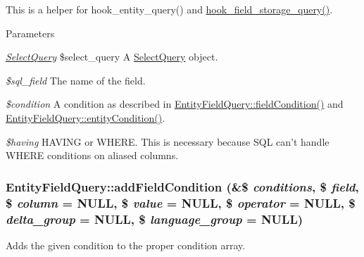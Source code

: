 This is a helper for hook\_\-entity\_\-query() and \hyperlink{group__field__storage_gaf46795ee1b678a72b4457b524303c794}{hook\_\-field\_\-storage\_\-query()}.


\begin{DoxyParams}{Parameters}
\item[{\em \hyperlink{classSelectQuery}{SelectQuery}}]\$select\_\-query A \hyperlink{classSelectQuery}{SelectQuery} object. \item[{\em \$sql\_\-field}]The name of the field. \item[{\em \$condition}]A condition as described in \hyperlink{classEntityFieldQuery_aa8f9660691c0ff6aca2e535c3df78e92}{EntityFieldQuery::fieldCondition()} and \hyperlink{classEntityFieldQuery_a08559bd2f164f707a7ad18eff6622017}{EntityFieldQuery::entityCondition()}. \item[{\em \$having}]HAVING or WHERE. This is necessary because SQL can't handle WHERE conditions on aliased columns. \end{DoxyParams}
\hypertarget{classEntityFieldQuery_addc28605e17a54c0198f3cd6e2753489}{
\subsubsection[{addFieldCondition}]{\setlength{\rightskip}{0pt plus 5cm}EntityFieldQuery::addFieldCondition (\&\$ {\em conditions}, \/  \$ {\em field}, \/  \$ {\em column} = {\ttfamily NULL}, \/  \$ {\em value} = {\ttfamily NULL}, \/  \$ {\em operator} = {\ttfamily NULL}, \/  \$ {\em delta\_\-group} = {\ttfamily NULL}, \/  \$ {\em language\_\-group} = {\ttfamily NULL})}}
\label{classEntityFieldQuery_addc28605e17a54c0198f3cd6e2753489}
Adds the given condition to the proper condition array.


